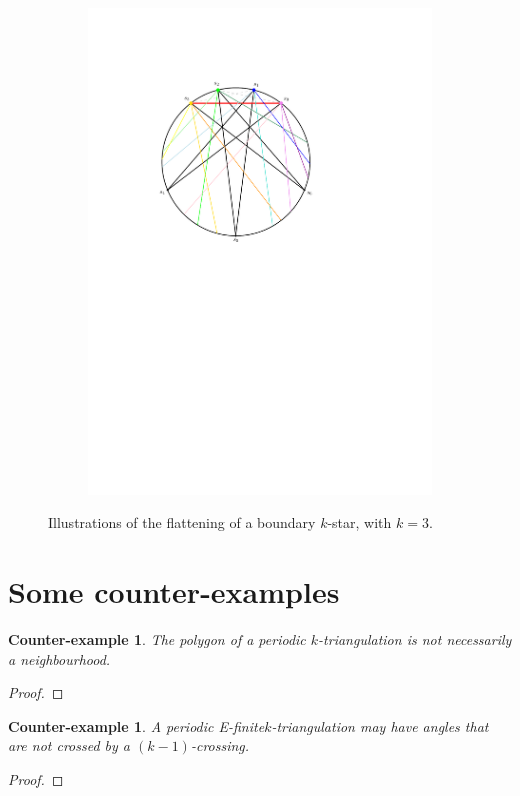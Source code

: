 \documentclass{amsart}
\newtheorem{ce}[theorem]{Counter-example}
\theoremstyle{remark}
\newcommand*{\nbd}[0]{neighbourhood\xspace}
\newcommand*{\ef}[0]{E-finite\xspace}
\newcommand*{\ktg}[0]{$k$-triangulation\xspace}
\begin{document}
\begin{figure}
\begin{subfigure}[b]{.48\textwidth}
    \includegraphics[width=\textwidth,page=2]{exFlattening}
  \end{subfigure}
  \caption{Illustrations of the flattening of a boundary $k$-star, with $k=3$.}
  \label{fig:exProofStar}
\end{figure}


\section{Some counter-examples}

\begin{ce}
The polygon of a periodic \ktg is not necessarily a \nbd.
\end{ce}
\begin{proof}

\end{proof}

\begin{ce}
A periodic \ef \ktg may have angles that are not crossed by a $(k-1)$-crossing.
\end{ce}
\begin{proof}

\end{proof}
\end{document}
